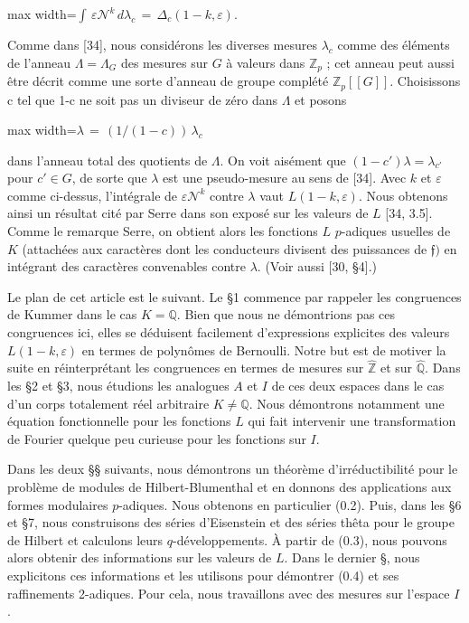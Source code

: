 \documentclass[11pt]{article}
\newcommand{\DFormula}[1]{\par\smallskip\noindent\begin{adjustbox}{max width=\linewidth}$\displaystyle #1$\end{adjustbox}\par\smallskip}
\begin{document}
\par
\DFormula{\int \,\varepsilon \mathcal{N}^{k}\,d\lambda _{c}\,=\,\Delta _{c}(1-k,\varepsilon ).}
\par
Comme dans [34], nous considérons les diverses mesures \(\lambda _{c}\) comme des éléments de l’anneau \(\Lambda =\Lambda _{G}\) des mesures sur \(G\) à valeurs dans \(\mathbb{Z}_{p}\) ; cet anneau peut aussi être décrit comme une sorte d’anneau de groupe complété \(\mathbb{Z}_{p}[[G]]\). Choisissons c tel que 1-c ne soit pas un diviseur de zéro dans \(\Lambda \) et posons\par
\par
\DFormula{\lambda \,=\,(1/(1-c))\,\lambda _{c}}
\par
dans l’anneau total des quotients de \(\Lambda \). On voit aisément que \((1-c')\lambda =\lambda _{c'}\) pour \(c'\in G\), de sorte que \(\lambda \) est une pseudo-mesure au sens de [34]. Avec \(k\) et \(\varepsilon \) comme ci-dessus, l’intégrale de \(\varepsilon \mathcal{N}^{k}\) contre \(\lambda \) vaut \(L(1-k,\varepsilon )\). Nous obtenons ainsi un résultat cité par Serre dans son exposé sur les valeurs de \(L\) [34, 3.5]. Comme le remarque Serre, on obtient alors les fonctions \(L\) \(p\)-adiques usuelles de \(K\) (attachées aux caractères dont les conducteurs divisent des puissances de \(𝔣)\) en intégrant des caractères convenables contre \(\lambda \). (Voir aussi [30, §4].)\par
\par
Le plan de cet article est le suivant. Le §1 commence par rappeler les congruences de Kummer dans le cas \(K=\mathbb{Q}\). Bien que nous ne démontrions pas ces congruences ici, elles se déduisent facilement d’expressions explicites des valeurs \(L(1-k,\varepsilon )\) en termes de polynômes de Bernoulli. Notre but est de motiver la suite en réinterprétant les congruences en termes de mesures sur \(\widehat{\mathbb{Z}}\) et sur \(\widehat{\mathbb{Q}}\). Dans les §2 et §3, nous étudions les analogues \(A\) et \(I\) de ces deux espaces dans le cas d’un corps totalement réel arbitraire \(K\neq \mathbb{Q}\). Nous démontrons notamment une équation fonctionnelle pour les fonctions \(L\) qui fait intervenir une transformation de Fourier quelque peu curieuse pour les fonctions sur \(I\).\par
\par
Dans les deux §§ suivants, nous démontrons un théorème d’irréductibilité pour le problème de modules de Hilbert-Blumenthal et en donnons des applications aux formes modulaires \(p\)-adiques. Nous obtenons en particulier (0.2). Puis, dans les §6 et §7, nous construisons des séries d’Eisenstein et des séries thêta pour le groupe de Hilbert et calculons leurs \(q\)-développements. À partir de (0.3), nous pouvons alors obtenir des informations sur les valeurs de \(L\). Dans le dernier §, nous explicitons ces informations et les utilisons pour démontrer (0.4) et ses raffinements 2-adiques. Pour cela, nous travaillons avec des mesures sur l’espace \(I\).\par
\end{document}
